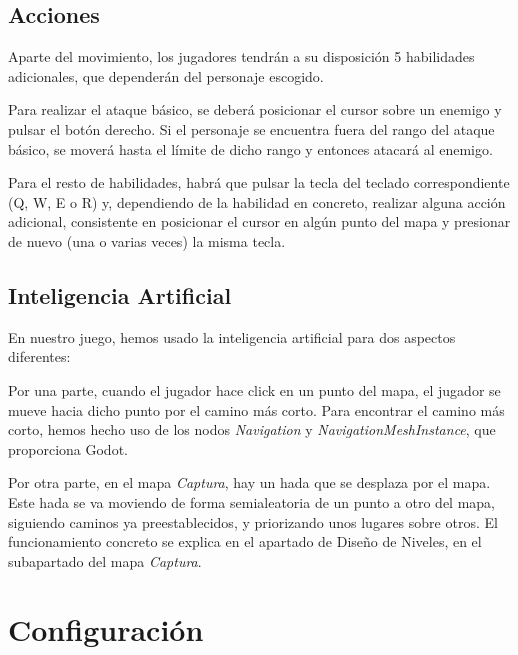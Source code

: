 \subsection{Acciones}
Aparte del movimiento, los jugadores tendrán a su disposición 5 habilidades adicionales, que dependerán del personaje escogido. 

Para realizar el ataque básico, se deberá posicionar el cursor sobre un enemigo y pulsar el botón derecho. Si el personaje se encuentra fuera del rango del ataque básico, se moverá hasta el límite de dicho rango y entonces atacará al enemigo. 

Para el resto de habilidades, habrá que pulsar la tecla del teclado correspondiente (Q, W, E o R) y, dependiendo de la habilidad en concreto, realizar alguna acción adicional, consistente en posicionar el cursor en algún punto del mapa y presionar de nuevo (una o varias veces) la misma tecla.

\subsection{Inteligencia Artificial}
En nuestro juego, hemos usado la inteligencia artificial para dos aspectos diferentes:

\vspace{\baselineskip}

Por una parte, cuando el jugador hace click en un punto del mapa, el jugador se mueve hacia dicho punto por el camino más corto. Para encontrar el camino más corto, hemos hecho uso de los nodos \emph{Navigation} y \emph{NavigationMeshInstance}, que proporciona Godot.

Por otra parte, en el mapa \emph{Captura}, hay un hada que se desplaza por el mapa. Este hada se va moviendo de forma semialeatoria de un punto a otro del mapa, siguiendo caminos ya preestablecidos, y priorizando unos lugares sobre otros. El funcionamiento concreto se explica en el apartado de Diseño de Niveles, en el subapartado del mapa \emph{Captura}.


\section{Configuración}

